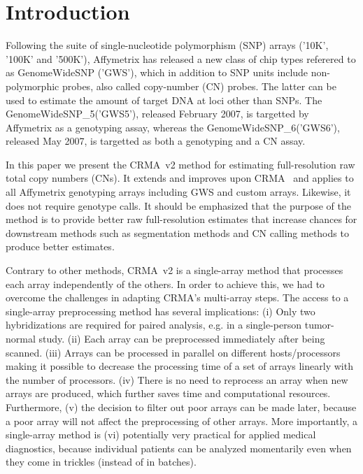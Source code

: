 \documentclass{bioinfo}
\newcommand{\GWS}{GWS\xspace}
\newcommand{\GWSFive}{GWS5\xspace}
\newcommand{\GWSSix}{GWS6\xspace}
\newcommand{\GWSFivef}{GenomeWideSNP\_5\xspace}
\newcommand{\GWSSixf}{GenomeWideSNP\_6\xspace}
\begin{document}
\section{Introduction}
\label{secBackground}
Following the suite of single-nucleotide polymorphism (SNP) arrays ('10K', '100K' and '500K'), Affymetrix has released a new class of chip types referered to as GenomeWideSNP ('GWS'), which in addition to SNP units include non-polymorphic probes, also called copy-number (CN) probes.  The latter can be used to estimate the amount of target DNA at loci other than SNPs.  The \GWSFivef ('\GWSFive'), released February 2007, is targetted by Affymetrix as a genotyping assay, whereas the \GWSSixf ('\GWSSix'), released May 2007, is targetted as both a genotyping and a CN assay.

In this paper we present the CRMA~v2 method for estimating full-resolution raw total copy numbers (CNs).  It extends and improves upon CRMA~\citep{BengtssonH_etal_2008} and applies to all Affymetrix genotyping arrays including \GWS and custom arrays. Likewise, it does not require genotype calls.  
It should be emphasized that the purpose of the method is to provide better raw full-resolution estimates that increase chances for downstream methods such as segmentation methods and CN calling methods to produce better estimates.

Contrary to other methods, CRMA~v2 is a single-array method that processes each array independently of the others.  In order to achieve this, we had to overcome the challenges in adapting CRMA's multi-array steps.
The access to a single-array preprocessing method has several implications: (i) Only two hybridizations are required for paired analysis, e.g. in a single-person tumor-normal study. (ii) Each array can be preprocessed immediately after being scanned.  (iii) Arrays can be processed in parallel on different hosts/processors making it possible to decrease the processing time of a set of arrays linearly with the number of processors.  (iv) There is no need to reprocess an array when new arrays are produced, which further saves time and computational resources.   Furthermore, (v) the decision to filter out poor arrays can be made later, because a poor array will not affect the preprocessing of other arrays. %
More importantly, a single-array method is (vi) potentially very practical for applied medical diagnostics, because individual patients can be analyzed momentarily even when they come in trickles (instead of in batches).
\end{document}
